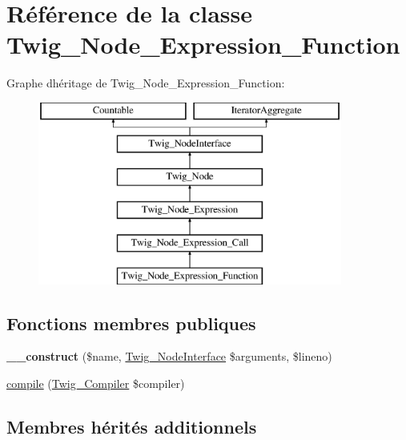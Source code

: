 \hypertarget{class_twig___node___expression___function}{}\section{Référence de la classe Twig\+\_\+\+Node\+\_\+\+Expression\+\_\+\+Function}
\label{class_twig___node___expression___function}
Graphe d\textquotesingle{}héritage de Twig\+\_\+\+Node\+\_\+\+Expression\+\_\+\+Function\+:\begin{figure}[H]
\begin{center}
\leavevmode
\includegraphics[height=6.000000cm]{class_twig___node___expression___function}
\end{center}
\end{figure}
\subsection*{Fonctions membres publiques}
\begin{DoxyCompactItemize}
\item 
{\bfseries \+\_\+\+\_\+construct} (\$name, \hyperlink{interface_twig___node_interface}{Twig\+\_\+\+Node\+Interface} \$arguments, \$lineno)\hypertarget{class_twig___node___expression___function_a38ef75f1dd2ff8264797791ff87b6648}{}\label{class_twig___node___expression___function_a38ef75f1dd2ff8264797791ff87b6648}

\item 
\hyperlink{class_twig___node___expression___function_a4e0faa87c3fae583620b84d3607085da}{compile} (\hyperlink{class_twig___compiler}{Twig\+\_\+\+Compiler} \$compiler)
\end{DoxyCompactItemize}
\subsection*{Membres hérités additionnels}


